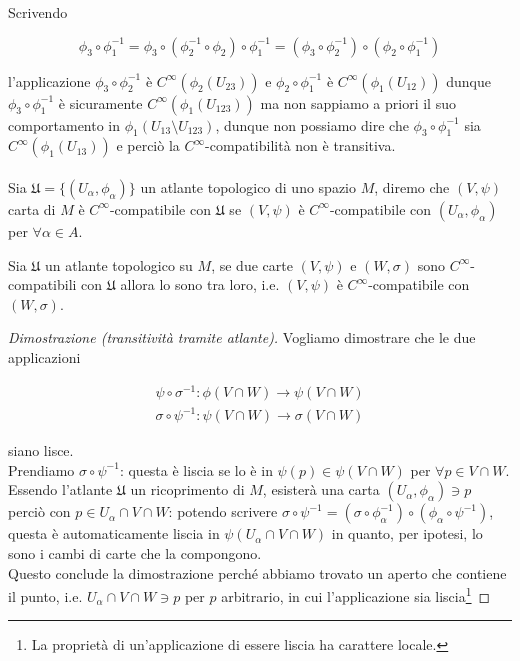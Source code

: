 Scrivendo

\begin{equation}
	\phi_{3} \circ \phi_{1}^{-1} = \phi_{3} \circ (\phi_{2}^{-1} \circ \phi_{2}) \circ \phi_{1}^{-1} %
	= (\phi_{3} \circ \phi_{2}^{-1}) \circ (\phi_{2} \circ \phi_{1}^{-1})
\end{equation}

l'applicazione $ \phi_{3} \circ \phi_{2}^{-1} $ è $ C^{\infty}(\phi_{2}(U_{23})) $ e $ \phi_{2} \circ \phi_{1}^{-1} $ è $ C^{\infty}(\phi_{1}(U_{12})) $ dunque $ \phi_{3} \circ \phi_{1}^{-1} $ è sicuramente $ C^{\infty}(\phi_{1}(U_{123})) $ ma non sappiamo a priori il suo comportamento in $ \phi_{1}(U_{13} \setminus U_{123}) $, dunque non possiamo dire che $ \phi_{3} \circ \phi_{1}^{-1} $ sia $ C^{\infty}(\phi_{1}(U_{13})) $ e perciò la $ C^{\infty} $-compatibilità non è transitiva.\\\\
%
Sia $ \mathfrak{U} = \{(U_{\alpha},\phi_{\alpha})\} $ un atlante topologico di uno spazio $ M $, diremo che $ (V,\psi) $ carta di $ M $ è $ C^{\infty} $-compatibile con $ \mathfrak{U} $ se $ (V,\psi) $ è $ C^{\infty} $-compatibile con $ (U_{\alpha},\phi_{\alpha}) $ per $ \forall \alpha \in A $.

\begin{definition}
	Sia $ \mathfrak{U} $ un atlante topologico su $ M $, se due carte $ (V,\psi) $ e $ (W,\sigma) $ sono $ C^{\infty} $-compatibili con $ \mathfrak{U} $ allora lo sono tra loro, i.e. $ (V,\psi) $ è $ C^{\infty} $-compatibile con $ (W,\sigma) $.
\end{definition}

\begin{proof}[Dimostrazione (transitività tramite atlante)]
	Vogliamo dimostrare che le due applicazioni
	
	\begin{gather}
		\psi \circ \sigma^{-1} : \phi(V \cap W) \to \psi(V \cap W)\\
		\sigma \circ \psi^{-1} : \psi(V \cap W) \to \sigma(V \cap W)
	\end{gather}

	siano lisce.\\
	Prendiamo $ \sigma \circ \psi^{-1} $: questa è liscia se lo è in $ \psi(p) \in \psi(V \cap W) $ per $ \forall p \in V \cap W $.\\
	Essendo l'atlante $ \mathfrak{U} $ un ricoprimento di $ M $, esisterà una carta $ (U_{\alpha},\phi_{\alpha}) \ni p $ perciò con $ p \in U_{\alpha} \cap V \cap W $: potendo scrivere $ \sigma \circ \psi^{-1} = (\sigma \circ \phi_{\alpha}^{-1}) \circ (\phi_{\alpha} \circ \psi^{-1}) $, questa è automaticamente liscia in $ \psi(U_{\alpha} \cap V \cap W) $ in quanto, per ipotesi, lo sono i cambi di carte che la compongono.\\
	Questo conclude la dimostrazione perché abbiamo trovato un aperto che contiene il punto, i.e. $ U_{\alpha} \cap V \cap W \ni p $ per $ p $ arbitrario, in cui l'applicazione sia liscia\footnote{%
		La proprietà di un'applicazione di essere liscia ha carattere locale.%
	}
\end{proof}

